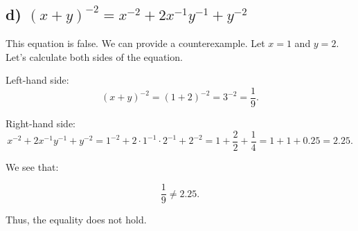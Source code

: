 \documentclass{article}
\begin{document}
\subsection*{d) $(x + y)^{-2} = x^{-2} + 2x^{-1}y^{-1} + y^{-2}$}

This equation is false. We can provide a counterexample. Let $x = 1$ and $y = 2$. Let’s calculate both sides of the equation.

Left-hand side:
\[
(x + y)^{-2} = (1 + 2)^{-2} = 3^{-2} = \frac{1}{9}.
\]

Right-hand side:
\[
x^{-2} + 2x^{-1}y^{-1} + y^{-2} = 1^{-2} + 2 \cdot 1^{-1} \cdot 2^{-1} + 2^{-2} = 1 + \frac{2}{2} + \frac{1}{4} = 1 + 1 + 0.25 = 2.25.
\]

We see that:

\[
\frac{1}{9} \neq 2.25.
\]

Thus, the equality does not hold.
\end{document}
